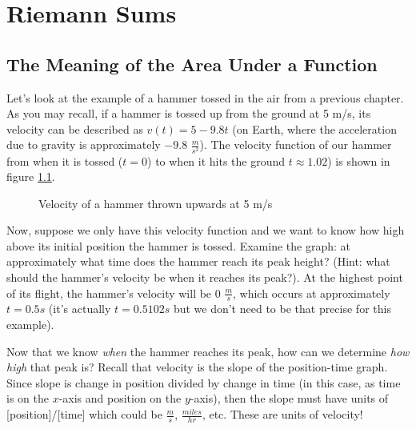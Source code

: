 \chapter{Riemann Sums}

\section{The Meaning of the Area Under a Function}

Let's look at the example of a hammer tossed in the air from a previous chapter. As you may recall, if a hammer is tossed up from the ground at 5 m/s, its velocity can be described as $v(t) = 5-9.8t$ (on Earth, where the acceleration due to gravity is approximately $-9.8$ $\frac{m}{s^2}$). The velocity function of our hammer from when it is tossed ($t=0$) to when it hits the ground $t\approx1.02$) is shown in figure \ref{fig:hammer}.

\begin{figure}[htbp]
	\centering
	\caption{Velocity of a hammer thrown upwards at 5 m/s}
	\label{fig:hammer}
\end{figure}

Now, suppose we only have this velocity function and we want to know how high above its initial position the hammer is tossed. Examine the graph: at approximately what time does the hammer reach its peak height? (Hint: what should the hammer's velocity be when it reaches its peak?). At the highest point of its flight, the hammer's velocity will be $0$ $\frac{m}{s}$, which occurs at approximately $t=0.5s$ (it's actually $t=0.5102s$ but we don't need to be that precise for this example). 

Now that we know \textit{when} the hammer reaches its peak, how can we determine \textit{how high} that peak is? Recall that velocity is the slope of the position-time graph. Since slope is change in position divided by change in time (in this case, as time is on the $x$-axis and position on the $y$-axis), then the slope must have units of [position]/[time] which could be $\frac{m}{s}$, $\frac{miles}{hr}$, etc. These are units of velocity! 

